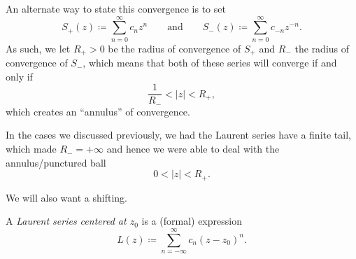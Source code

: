 An alternate way to state this convergence is to set
\[S_+(z)\coloneqq\sum_{n=0}^\infty c_nz^n\qquad\text{and}\qquad S_-(z)\coloneqq\sum_{n=0}^\infty c_{-n}z^{-n}.\]
As such, we let $R_+>0$ be the radius of convergence of $S_+$ and $R_-$ the radius of convergence of $S_-$, which means that both of these series will converge if and only if
\[\frac1{R_-}<|z|<R_+,\]
which creates an ``annulus'' of convergence.
\begin{remark}
	In the cases we discussed previously, we had the Laurent series have a finite tail, which made $R_-=+\infty$ and hence we were able to deal with the annulus/punctured ball
	\[0<|z|<R_+.\]
\end{remark}
We will also want a shifting.
\begin{defihelper}
	A \textit{Laurent series centered at $z_0$} is a (formal) expression
	\[L(z)\coloneqq\sum_{n=-\infty}^\infty c_n(z-z_0)^n.\]
\end{defihelper}

